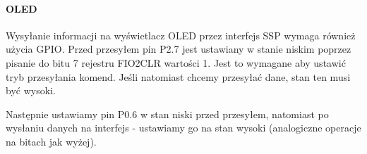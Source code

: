    \paragraph{OLED}
        
	Wysyłanie informacji na wyświetlacz OLED przez interfejs SSP wymaga
	również użycia GPIO. Przed przesyłem pin P2.7 jest ustawiany w
	stanie niskim poprzez pisanie do bitu 7 rejestru FIO2CLR
	wartości 1. Jest to wymagane aby ustawić tryb przesyłania komend.
	Jeśli natomiast chcemy przesyłać dane, stan ten musi być wysoki.

	Następnie ustawiamy pin P0.6 w stan niski przed przesyłem,
	natomiast po wysłaniu danych na interfejs - ustawiamy go na
	stan wysoki (analogiczne operacje na bitach jak wyżej).
